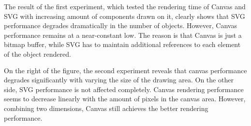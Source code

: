 The result of the first experiment, which tested the rendering time of Canvas and SVG with increasing amount of components drawn on it, clearly shows that SVG performance degrades dramatically in the number of objects. However, Canvas performance remains at a near-constant low. The reason is that Canvas is just a bitmap buffer, while SVG has to maintain additional references to each element of the object rendered.

On the right of the figure, the second experiment reveals  that canvas performance degrades significantly with varying the size of the drawing area. On the other side, SVG performance is not affected completely. Canvas rendering performance seems to decrease  linearly with the amount of pixels in the canvas area. However, combining two dimensions, Canvas still achieves the better rendering performance.
